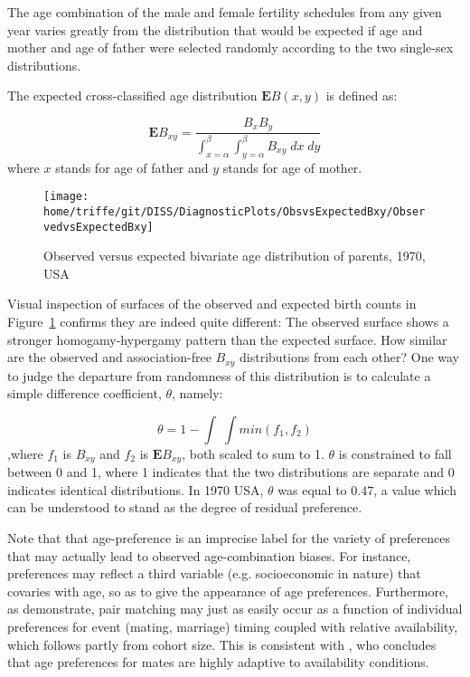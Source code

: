 
The age combination of the male and female fertility schedules from
any given year varies greatly from the distribution that would be expected if
age and mother and age of father were selected randomly according to the two
single-sex distributions.

The expected cross-classified age distribution $\textbf{E}B(x,y)$ is defined as:

\begin{equation}
\textbf{E}B_{xy} = \frac{B_x B_y}{\int _{x = \alpha} ^\beta \int _{y = \alpha}
^\beta B_{xy} \; dx \;dy}
\end{equation}
where $x$ stands for age of father and $y$ stands for age of mother.

\begin{figure}
        \centering  
          \caption{Observed versus expected bivariate age distribution of
          parents, 1970, USA}
          \texttt{[image: home/triffe/git/DISS/DiagnosticPlots/ObsvsExpectedBxy/ObservedvsExpectedBxy]}
          \label{fig:US1970obsexp}
\end{figure}

Visual inspection of surfaces of the observed and expected birth counts in
Figure~\ref{fig:US1970obsexp} confirms they are indeed quite different: The
observed surface shows a stronger homogamy-hypergamy pattern than the expected surface. How similar are the
observed and association-free $B_{xy}$ distributions from each other? One way to
judge the departure from randomness of this distribution is to calculate a
simple difference coefficient, $\theta$, namely:

\begin{equation}
\theta = 1 - \int \;\int min(f_1, f_2)
\end{equation}
,where $f_1$ is $B_{xy}$ and $f_2$ is $\textbf{E}B_{xy}$, both scaled to sum to
1. $\theta$ is constrained to fall between 0 and 1, where 1 indicates that the
two distributions are separate and 0 indicates identical distributions. In 1970 USA,
$\theta$ was equal to $0.47$, a value which can be understood to stand as the
degree of residual preference.

Note that that age-preference is an imprecise label for the variety
of preferences that may actually lead to observed age-combination biases. For
instance, preferences may reflect a third variable (e.g. socioeconomic
in nature) that covaries with age, so as to give the appearance of age
preferences. Furthermore, as \citet{bergstrom1989effects, bergstrom1994sweden}
demonstrate, pair matching may just as easily occur as a function of individual
preferences for event (mating, marriage) timing coupled with relative
availability, which follows partly from cohort size. This is consistent with
\citet{bhrolchain2001flexibility}, who concludes that age preferences for
mates are highly adaptive to availability conditions.

